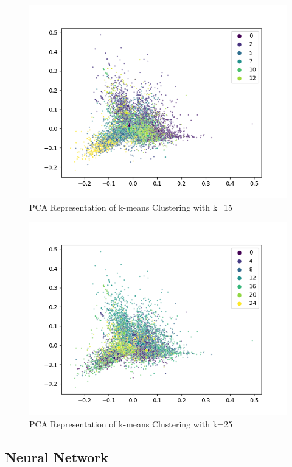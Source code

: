 \documentclass[12pt,letterpaper,oneside,titlepage]{article}
\begin{document}
\begin{figure}[ht]
    \centering
    \includegraphics[scale=0.61]{kmeans-15}
    \captionsetup{justification=centering}
    \caption{PCA Representation of k-means Clustering with k=15}
\end{figure}
\FloatBarrier

\begin{figure}[ht]
    \centering
    \includegraphics[scale=0.61]{kmeans-25}
    \captionsetup{justification=centering}
    \caption{PCA Representation of k-means Clustering with k=25}
\end{figure}
\FloatBarrier

\pagebreak

\subsection{Neural Network}
\end{document}
